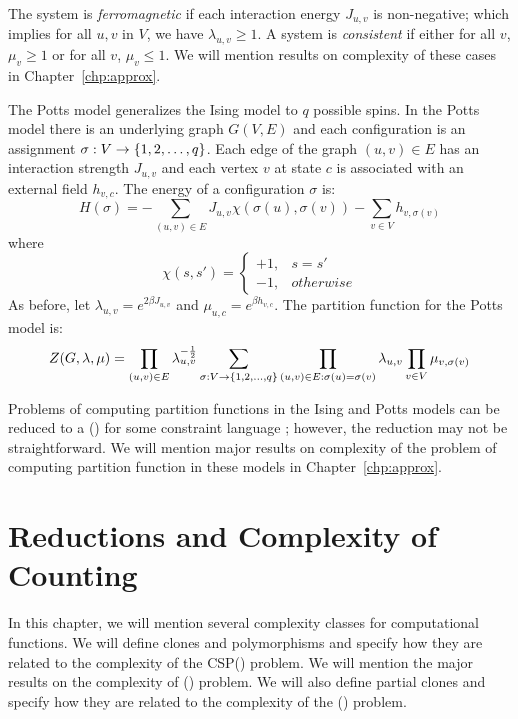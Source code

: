 The system is \emph{ferromagnetic} if each interaction energy \(J_{u,v}\) is non-negative; 
which implies for all \(u,v\) in \(V\), we have \(\lambda_{u,v} \ge 1\)\@.
A system is \emph{consistent} if
either for all \(v\), \(\mu_v\ge 1\) or for all \(v\), \(\mu_v \le 1\)\@. We will
mention results on complexity of these cases in Chapter~\ref{chp:approx}\@.

The Potts model generalizes the Ising model to \(q\) possible spins.
In the Potts model there is an underlying graph \(G(V,E)\) and 
each configuration is an assignment \(\sigma:V\to \{{{1,2,\dotsc,q}}\}\)\@.
Each edge of the graph \((u,v)\in E\) has an interaction
strength \(J_{u,v}\) and each vertex \(v\) at state \(c\) is associated with an
external field \(h_{v,c}\)\@. The energy of a configuration $\sigma$ is:
\[H(\sigma)=-\sum_{(u,v)\in E} J_{u,v}\chi(\sigma(u),\sigma(v)) - \sum_{v\in V} 
h_{v,\sigma(v)}\]
where
\[\chi(s,s')=\begin{cases}+1, & s=s'\\-1, & otherwise\end{cases}\]
As before, let \(\lambda_{u,v}=e^{2\beta J_{u,v}}\) and
\(\mu_{u,c}=e^{\beta h_{v,c}}\)\@. The partition function for the Potts model is:
\[Z(G,\lambda,\mu)=\prod_{(u,v)\in E}\lambda_{u,v}^{-\frac{1}{2}}
\sum_{\sigma:V\to\{{{1,2,\dotsc,q}}\}} \prod_{(u,v)\in E:\sigma(u)=\sigma(v)}\lambda_{u,v}
\prod_{v\in V}\mu_{v,\sigma(v)}\]

Problems of computing partition functions in the Ising and Potts models can be
reduced to a \ccsp(\mrelset) for some constraint language \mrelset; however, the reduction
may not be straightforward. We will mention major results on complexity of the problem of computing 
partition function in these models in Chapter~\ref{chp:approx}\@.

\chapter{Reductions and Complexity of Counting}
In this chapter, we will mention several complexity classes for computational functions.
We will define clones and polymorphisms and specify how they are related to
the complexity of the CSP(\mrelset) problem. We will mention the major results on the complexity of 
\ccsp(\mrelset) problem. We will also define partial clones and specify
how they are related to the complexity of the \ccsp(\mrelset) problem.

